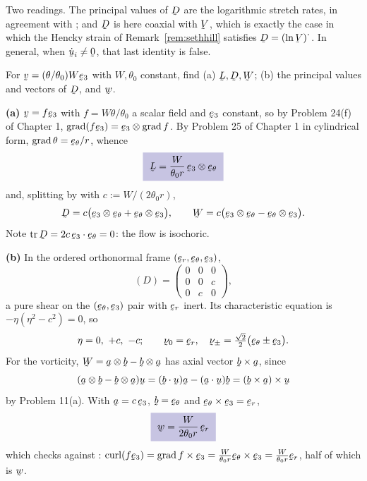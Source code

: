 \begin{solution}
Two readings. The principal values of $\bD$ are the logarithmic stretch
rates, in agreement with ; and $\bD$ is here coaxial with $\bV$,
which is exactly the case in which the Hencky strain of
Remark~\ref{rem:sethhill} satisfies $\bD=(\ln\bV)^{\textstyle\cdot}$. In
general, when $\dot\bu_{i}\neq\bze$, that last identity is false.
\end{solution}

\begin{problem}
For $\bv=(\theta/\theta_{0})W\be_{3}$ with $W,\theta_{0}$ constant, find
(a) $\bL,\bD,\bW$; (b) the principal values and vectors of $\bD$, and
$\bw$.
\end{problem}

\begin{solution}
\textbf{(a)} $\bv=f\be_{3}$ with $f=W\theta/\theta_{0}$ a scalar field and
$\be_{3}$ constant, so by Problem 24(f) of Chapter 1,
$\grad(f\be_{3})=\be_{3}\otimes\grad f$. By Problem 25 of Chapter 1 in
cylindrical form, $\grad\theta=\bet/r$, whence
\[
   \boxed{\ \bL=\frac{W}{\theta_{0}r}\,\be_{3}\otimes\bet\ }
\]
and, splitting by  with $c:=W/(2\theta_{0}r)$,
\[
   \bD=c\big(\be_{3}\otimes\bet+\bet\otimes\be_{3}\big),
   \qquad
   \bW=c\big(\be_{3}\otimes\bet-\bet\otimes\be_{3}\big).
\]
Note $\tr\bD=2c\,\ip{\be_{3}}{\bet}=0$: the flow is isochoric.

\textbf{(b)} In the ordered orthonormal frame $(\ber,\bet,\be_{3})$,
\[
   (D)=\begin{pmatrix}0&0&0\\ 0&0&c\\ 0&c&0\end{pmatrix},
\]
a pure shear on the $(\bet,\be_{3})$ pair with $\ber$ inert. Its
characteristic equation is $-\eta(\eta^{2}-c^{2})=0$, so
\[
   \eta=0,\ +c,\ -c;
   \qquad
   \bnu_{0}=\ber,\quad
   \bnu_{\pm}=\tfrac{\sqrt2}{2}\big(\bet\pm\be_{3}\big).
\]
For the vorticity, $\bW=\ba\otimes\bb-\bb\otimes\ba$ has axial vector
$\bb\times\ba$, since
\[
   (\ba\otimes\bb-\bb\otimes\ba)\bu=(\ip\bb\bu)\ba-(\ip\ba\bu)\bb
   =(\bb\times\ba)\times\bu
\]
by Problem 11(a). With $\ba=c\,\be_{3}$, $\bb=\bet$ and
$\bet\times\be_{3}=\ber$,
\[
   \boxed{\ \bw=\frac{W}{2\theta_{0}r}\,\ber\ }
\]
which checks against : $\crl(f\be_{3})=\grad f\times\be_{3}
=\tfrac{W}{\theta_{0}r}\bet\times\be_{3}=\tfrac{W}{\theta_{0}r}\ber$, half
of which is $\bw$.
\end{solution}

